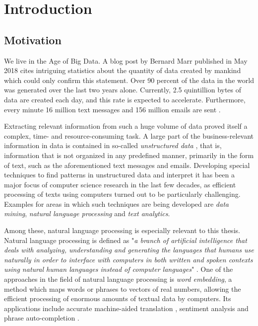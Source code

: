 
\chapter{Introduction}
\section{Motivation}
We live in the Age of Big Data. A blog post by Bernard Marr published in May 2018 cites intriguing statistics about the quantity of data created by mankind which could only confirm this statement. Over 90 percent of the data in the world was generated over the last two years alone. Currently, 2.5 quintillion bytes of data are created each day, and this rate is expected to accelerate. Furthermore, every minute 16 million text messages and 156 million emails are sent \cite{forbes-data}. 

Extracting relevant information from such a huge volume of data proved itself a complex, time- and resource-consuming task. A large part of the business-relevant information in data is contained in so-called \textit{unstructured data} \cite{clarabridge}, that is, information that is not organized in any predefined manner, primarily in the form of text, such as the aforementioned text messages and emails. Developing special techniques to find patterns in unstructured data and interpret it has been a major focus of computer science research in the last few decades, as efficient processing of texts using computers turned out to be particularly challenging. Examples for areas in which such techniques are being developed are \textit{data mining}, \textit{natural language processing} and \textit{text analytics}.

Among these, natural language processing is especially relevant to this thesis. Natural language processing is defined as "\textit{a branch of artificial intelligence that deals with analyzing, understanding and generating the languages that humans use naturally in order to interface with computers in both written and spoken contexts using natural human languages instead of computer languages}" \cite{nlp-def}. One of the approaches in the field of natural language processing is \textit{word embedding}, a method which maps words or phrases to vectors of real numbers, allowing the efficient processing of enormous amounts of textual data by computers. Its applications include accurate machine-aided translation \cite{zou2013bilingual}, sentiment analysis \cite{hamilton2016inducing} and phrase auto-completion \cite{Sordoni:2015:HRE:2806416.2806493}.

